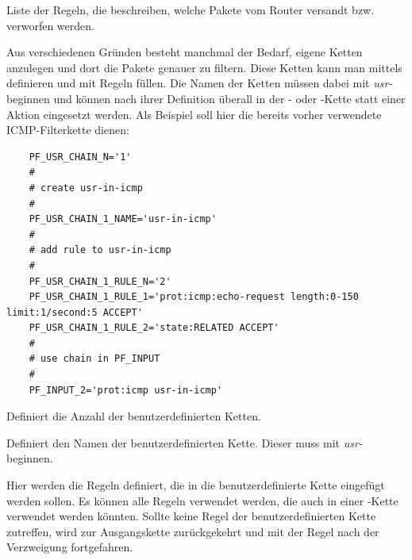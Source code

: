 \begin{description}
Liste der Regeln, die beschreiben, welche Pakete vom Router versandt
bzw. verworfen werden.
\end{description}


Aus verschiedenen Gründen besteht manchmal der Bedarf, eigene Ketten
anzulegen und dort die Pakete genauer zu filtern. Diese Ketten kann
man mittels  definieren und mit Regeln füllen. Die
Namen der Ketten müssen dabei mit \emph{usr-} beginnen und können nach ihrer
Definition überall in der - oder -Kette statt
einer Aktion eingesetzt werden. Als Beispiel soll hier die bereits vorher
verwendete ICMP-Filterkette dienen:

\begin{example}
{\footnotesize
\begin{verbatim}
    PF_USR_CHAIN_N='1'
    #
    # create usr-in-icmp
    #
    PF_USR_CHAIN_1_NAME='usr-in-icmp'
    #
    # add rule to usr-in-icmp
    #
    PF_USR_CHAIN_1_RULE_N='2'
    PF_USR_CHAIN_1_RULE_1='prot:icmp:echo-request length:0-150 limit:1/second:5 ACCEPT'
    PF_USR_CHAIN_1_RULE_2='state:RELATED ACCEPT'
    #
    # use chain in PF_INPUT
    #
    PF_INPUT_2='prot:icmp usr-in-icmp'
\end{verbatim}}
\end{example}

\begin{description}
 Definiert die Anzahl
der benutzerdefinierten Ketten.

Definiert den Namen der benutzerdefinierten Kette. Dieser muss mit \emph{usr-}
beginnen.

Hier werden die Regeln definiert, die in die benutzerdefinierte Kette
eingefügt werden sollen. Es können alle Regeln verwendet werden, die
auch in einer -Kette verwendet werden könnten.
Sollte keine Regel der benutzerdefinierten Kette zutreffen, wird zur
Ausgangskette zurückgekehrt und mit der Regel nach der Verzweigung fortgefahren.
\end{description}

